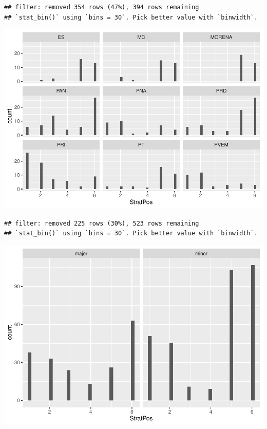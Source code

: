 \documentclass[
]{article}
\newenvironment{Shaded}{\begin{snugshade}}{\end{snugshade}}
\newcommand{\KeywordTok}[1]{\textcolor[rgb]{0.13,0.29,0.53}{\textbf{#1}}}
\newcommand{\NormalTok}[1]{#1}
\newcommand{\OperatorTok}[1]{\textcolor[rgb]{0.81,0.36,0.00}{\textbf{#1}}}
\newcommand{\StringTok}[1]{\textcolor[rgb]{0.31,0.60,0.02}{#1}}
\begin{document}
\begin{verbatim}
## filter: removed 354 rows (47%), 394 rows remaining
## `stat_bin()` using `bins = 30`. Pick better value with `binwidth`.
\end{verbatim}

\includegraphics{ProposalAnalysis_files/figure-latex/unnamed-chunk-9-3.pdf}

\begin{Shaded}
\end{Shaded}

\begin{verbatim}
## filter: removed 225 rows (30%), 523 rows remaining
## `stat_bin()` using `bins = 30`. Pick better value with `binwidth`.
\end{verbatim}

\includegraphics{ProposalAnalysis_files/figure-latex/unnamed-chunk-9-4.pdf}
\end{document}
